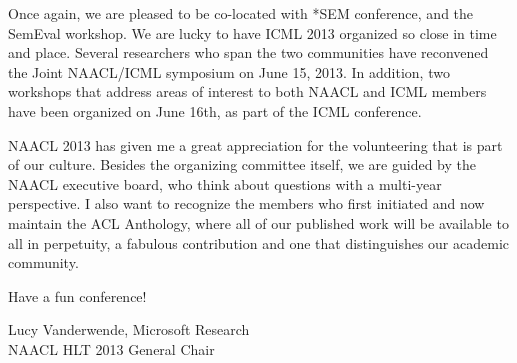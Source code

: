 \documentclass[11pt]{article}
\begin{document}
Once again, we are pleased to be co-located with *SEM conference, and the SemEval workshop. We are lucky to have ICML 2013 organized  so  close  in time and place.  Several  researchers who span the two communities have reconvened the Joint NAACL/ICML symposium on June  15, 2013. In addition, two workshops that address areas of interest to both NAACL and ICML members have been organized on June 16th, as part of the ICML conference.

NAACL 2013 has given me a great appreciation for the volunteering that is part of our culture. Besides the organizing committee itself, we are guided by the NAACL executive board, who think about questions with a multi-year perspective. I also want to recognize the members who first initiated and now maintain the ACL Anthology, where all of our published work will be available to all in perpetuity, a fabulous contribution and one that distinguishes our academic community.

Have a fun conference!

Lucy Vanderwende, Microsoft Research
\\NAACL HLT 2013 General Chair
\end{document}
